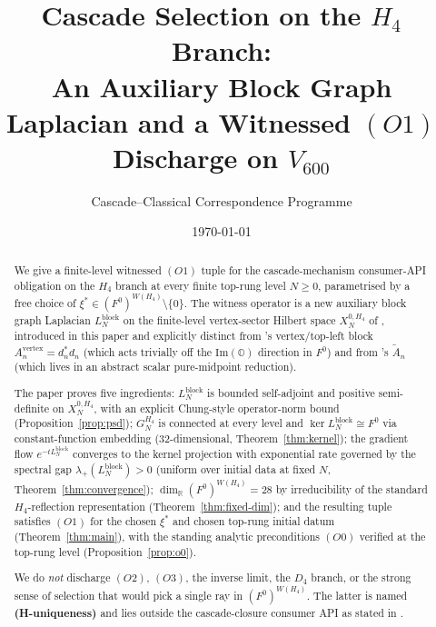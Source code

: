 \documentclass[11pt]{article}
\title{Cascade Selection on the $H_4$ Branch:\\
An Auxiliary Block Graph Laplacian and a Witnessed $(O1)$ Discharge
on $V_{600}$}
\author{Cascade--Classical Correspondence Programme}
\date{\today}
\newcommand{\OO}{\mathbb{O}}
\newcommand{\R}{\mathbb{R}}
\theoremstyle{definition}
\begin{document}
\maketitle

\begin{abstract}
We give a finite-level witnessed $(O1)$ tuple for the
cascade-mechanism consumer-API obligation
\cite[\S 3.4]{CascadeMechanism} on the $H_4$ branch at every
finite top-rung level $N \geq 0$, parametrised by a free choice of
$\xi^{*} \in (F^0)^{W(H_4)} \setminus \{0\}$. The witness operator
is a new auxiliary block graph Laplacian
$L_N^{\mathrm{block}}$ on the finite-level vertex-sector Hilbert
space $X_N^{0, H_4}$ of \cite[Definition~\texttt{def:Xn-0}]{RefinementSpaces},
introduced in this paper and explicitly distinct from
\cite{ClosureDynamics}'s vertex/top-left block
$A_n^{\mathrm{vertex}} = d_n^{*} d_n$ (which acts trivially off
the $\mathrm{Im}(\OO)$ direction in $F^{0}$) and from
\cite{RefinementCompat}'s $\widetilde A_n$ (which lives in an
abstract scalar pure-midpoint reduction).

The paper proves five ingredients:
$L_N^{\mathrm{block}}$ is bounded self-adjoint and positive
semi-definite on $X_N^{0, H_4}$, with an explicit Chung-style
operator-norm bound (Proposition~\ref{prop:psd});
$G_N^{H_4}$ is connected at every level and
$\ker L_N^{\mathrm{block}} \cong F^0$ via constant-function
embedding ($32$-dimensional, Theorem~\ref{thm:kernel});
the gradient flow $e^{-t L_N^{\mathrm{block}}}$ converges to the
kernel projection with exponential rate governed by the
spectral gap $\lambda_{+}(L_N^{\mathrm{block}}) > 0$
(uniform over initial data at fixed $N$, Theorem~\ref{thm:convergence});
$\dim_{\R} (F^0)^{W(H_4)} = 28$ by irreducibility of the standard
$H_4$-reflection representation (Theorem~\ref{thm:fixed-dim});
and the resulting tuple satisfies $(O1)$ for the chosen $\xi^{*}$
and chosen top-rung initial datum (Theorem~\ref{thm:main}), with
the standing analytic preconditions $(O0)$ verified at the
top-rung level (Proposition~\ref{prop:o0}).

We do \emph{not} discharge $(O2)$, $(O3)$, the inverse limit, the
$D_4$ branch, or the strong sense of selection that would pick
a single ray in $(F^0)^{W(H_4)}$. The latter is named
\textbf{(H-uniqueness)} and lies outside the cascade-closure
consumer API as stated in
\cite[\S 3.4 lines 637--639]{CascadeMechanism}.
\end{abstract}

\tableofcontents

\end{document}
